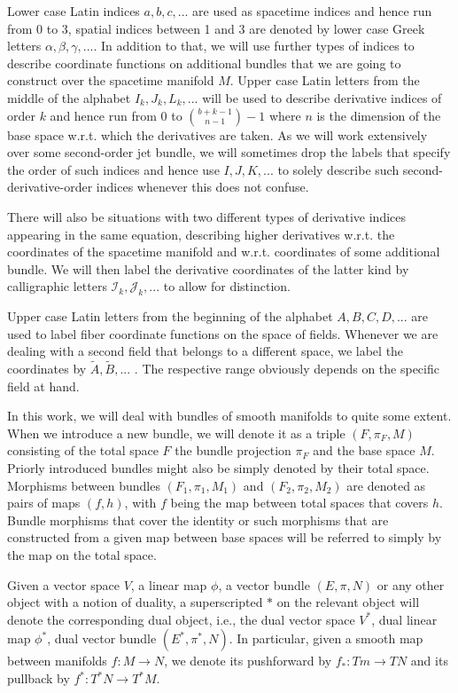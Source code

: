 Lower case Latin indices $a,b,c,...$ are used as spacetime indices and hence run from 0 to 3, spatial indices between 1 and 3 are denoted by lower case Greek letters $\alpha,\beta,\gamma,...$. In addition to that, we will use further types of indices to describe coordinate functions on additional bundles that we are going to construct over the spacetime manifold $M$. Upper case Latin letters from the middle of the alphabet $I_k,J_k,L_k,...$ will be used to describe derivative indices of order $k$ and hence run from $0$ to $\binom{b+k-1}{n-1}-1$ where $n$ is the dimension of the base space w.r.t. which the derivatives are taken. As we will work extensively over some second-order jet bundle, we will sometimes drop the labels that specify the order of such indices and hence use $I,J,K,...$ to solely describe such second-derivative-order indices whenever this does not confuse.

There will also be situations with two different types of derivative indices appearing in the same equation, describing higher derivatives w.r.t. the coordinates of the spacetime manifold and w.r.t. coordinates of some additional bundle. We will then label the derivative coordinates of the latter kind by calligraphic letters $\mathcal{I}_k, \mathcal{J}_k,...$ to allow for distinction.

Upper case Latin letters from the beginning of the alphabet $A,B,C,D,...$ are used to label fiber coordinate functions on the space of fields. Whenever we are dealing with a second field that belongs to a different space, we label the coordinates by $\tilde{A}, \tilde{B},...$ . The respective range obviously depends on the specific field at hand.

In this work, we will deal with bundles of smooth manifolds to quite some extent. When we introduce a new bundle, we will denote it as a triple $(F,\pi_F,M)$ consisting of the total space $F$ the bundle projection $\pi_F$ and the base space $M$. Priorly introduced bundles might also be simply denoted by their total space. Morphisms between bundles $(F_1,\pi_1,M_1)$ and $(F_2,\pi_2,M_2)$ are denoted as pairs of maps $(f,h)$, with $f$ being the map between total spaces that covers $h$. Bundle morphisms that cover the identity or such morphisms that are constructed from a given map between base spaces will be referred to simply by the map on the total space.

Given a vector space $V$, a linear map $\phi$, a vector bundle $(E,\pi,N)$ or any other object with a notion of duality, a superscripted $\ast$ on the relevant object will denote the corresponding dual object, i.e., the dual vector space $V^{\ast}$, dual linear map $\phi^{\ast}$, dual vector bundle $(E^{\ast}, \pi^{\ast},N)$. In particular, given a smooth map between manifolds $f : M \rightarrow N$, we denote its pushforward by $f_{\ast} : Tm \rightarrow TN$ and its pullback by $f^{\ast} : T^{\ast}N \rightarrow T^{\ast}M$.

